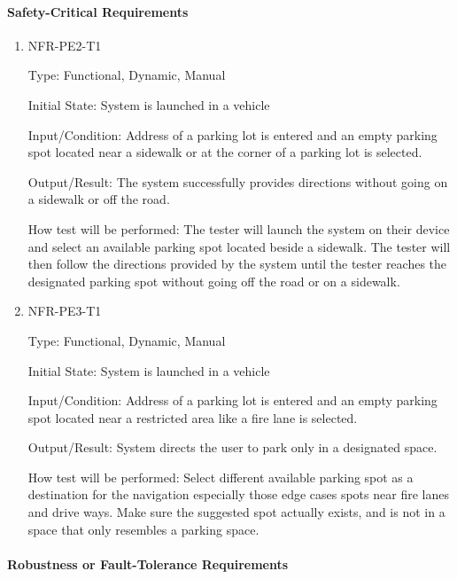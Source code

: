 \documentclass[12pt, titlepage]{article}
\begin{document}
\paragraph{Safety-Critical Requirements}

\begin{enumerate}

\item{NFR-PE2-T1}

Type: Functional, Dynamic, Manual
					
Initial State: System is launched in a vehicle
					
Input/Condition: Address of a parking lot is entered and an empty parking spot
located near a sidewalk or at the corner of a parking lot is selected.
					
Output/Result: The system successfully provides directions without going on a
sidewalk or off the road.
					
How test will be performed: The tester will launch the system on their device
and select an available parking spot located beside a sidewalk. The tester will
then follow the directions provided by the system until the tester reaches the
designated parking spot without going off the road or on a sidewalk.

\item{NFR-PE3-T1}

Type: Functional, Dynamic, Manual
					
Initial State: System is launched in a vehicle
					
Input/Condition: Address of a parking lot is entered and an empty parking spot
located near a restricted area like a fire lane is selected.
					
Output/Result: System directs the user to park only in a designated space.
					
How test will be performed: Select different available parking spot as a
destination for the navigation especially those edge cases spots near fire lanes
and drive ways. Make sure the suggested spot actually exists, and is not in a
space that only resembles a parking space.
					
\end{enumerate}

\paragraph{Robustness or Fault-Tolerance Requirements}
\end{document}
